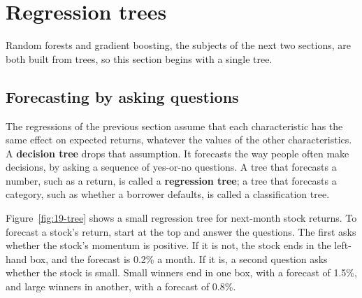 \section{Regression trees}
\label{sec:19-trees}

Random forests and gradient boosting, the subjects of the next two sections, are both built from trees, so this section begins with a single tree.

\subsection{Forecasting by asking questions}

The regressions of the previous section assume that each characteristic has the same effect on expected returns, whatever the values of the other characteristics. A \textbf{decision tree} drops that assumption. It forecasts the way people often make decisions, by asking a sequence of yes-or-no questions. A tree that forecasts a number, such as a return, is called a \textbf{regression tree}; a tree that forecasts a category, such as whether a borrower defaults, is called a classification tree.

Figure~\ref{fig:19-tree} shows a small regression tree for next-month stock returns. To forecast a stock's return, start at the top and answer the questions. The first asks whether the stock's momentum is positive. If it is not, the stock ends in the left-hand box, and the forecast is 0.2\% a month. If it is, a second question asks whether the stock is small. Small winners end in one box, with a forecast of 1.5\%, and large winners in another, with a forecast of 0.8\%.


